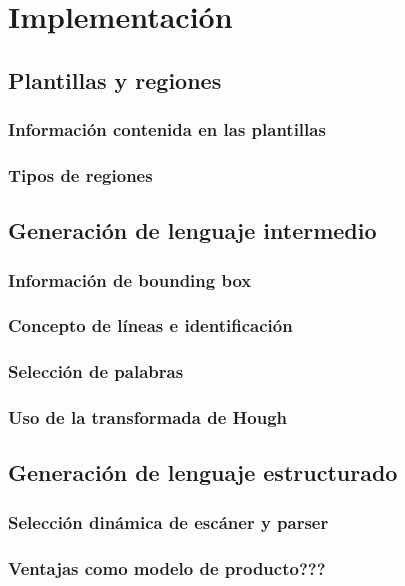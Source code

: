 
\chapter{Implementación}
\label{chap:implemetación}

\section{Plantillas y regiones}
\subsection{Información contenida en las plantillas}
\subsection{Tipos de regiones}

\section{Generación de lenguaje intermedio}
\subsection{Información de bounding box}
\subsection{Concepto de líneas e identificación}
\subsection{Selección de palabras}
\subsection{Uso de la transformada de Hough}

\section{Generación de lenguaje estructurado}
\subsection{Selección dinámica de escáner y parser}
\subsection{Ventajas como modelo de producto???}

